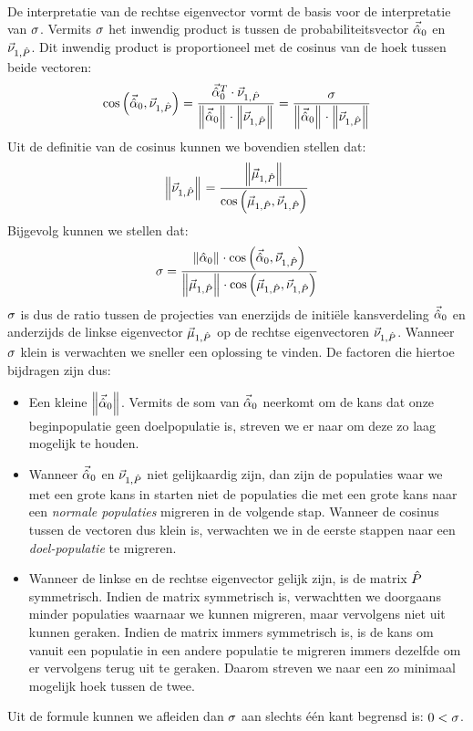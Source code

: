 \paragraph{}
De interpretatie van de rechtse eigenvector vormt de basis voor de interpretatie van $\metapa$. Vermits $\metapa$ het inwendig product is tussen de probabiliteitsvector $\probdistnormmeta{0}$ en $\evr[1,\removmat]$. Dit inwendig product is proportioneel met de cosinus van de hoek tussen beide vectoren:
\begin{equation}
\fun{\cos}{\probdistnormmeta{0},\evr[1,\removmat]}=\displaystyle\frac{\probdistnormmeta{0}^T\cdot\evr[1,\removmat]}{\dabs{\probdistnormmeta{0}}\cdot\dabs{\evr[1,\removmat]}}=\displaystyle\frac{\metapa}{\dabs{\probdistnormmeta{0}}\cdot\dabs{\evr[1,\removmat]}}
\end{equation}
Uit de definitie van de cosinus kunnen we bovendien stellen dat:
\begin{equation}
\dabs{\evr[1,\removmat]}=\displaystyle\frac{\dabs{\evl[1,\removmat]}}{\fun{\cos}{\evl[1,\removmat],\evr[1,\removmat]}}
\end{equation}
Bijgevolg kunnen we stellen dat:
\begin{equation}
\metapa=\displaystyle\frac{\dabs{\hat{\alpha}_0}\cdot\fun{\cos}{\probdistnormmeta{0},\evr[1,\removmat]}}{\dabs{\evl[1,\removmat]}\cdot\fun{\cos}{\evl[1,\removmat],\evr[1,\removmat]}}
\eqnlab{sigmaMeaning}
\end{equation}
$\metapa$ is dus de ratio tussen de projecties van enerzijds de initi\"ele kansverdeling $\probdistnormmeta{0}$ en anderzijds de linkse eigenvector $\evl[1,\removmat]$ op de rechtse eigenvectoren $\evr[1,\removmat]$. Wanneer $\metapa$ klein is verwachten we sneller een oplossing te vinden. De factoren die hiertoe bijdragen zijn dus:
\begin{itemize}
 \item Een kleine $\dabs{\probdistnormmeta{0}}$. Vermits de som van $\probdistnormmeta{0}$ neerkomt om de kans dat onze beginpopulatie geen doelpopulatie is, streven we er naar om deze zo laag mogelijk te houden.
 \item Wanneer $\probdistnormmeta{0}$ en $\evr[1,\removmat]$ niet gelijkaardig zijn, dan zijn de populaties waar we met een grote kans in starten niet de populaties die met een grote kans naar een \emph{normale populaties} migreren in de volgende stap. Wanneer de cosinus tussen de vectoren dus klein is, verwachten we in de eerste stappen naar een \emph{doel-populatie} te migreren.
 \item Wanneer de linkse en de rechtse eigenvector gelijk zijn, is de matrix $\removmat$ symmetrisch. Indien de matrix symmetrisch is, verwachtten we doorgaans minder populaties waarnaar we kunnen migreren, maar vervolgens niet uit kunnen geraken. Indien de matrix immers symmetrisch is, is de kans om vanuit een populatie in een andere populatie te migreren immers dezelfde om er vervolgens terug uit te geraken. Daarom streven we naar een zo minimaal mogelijk hoek tussen de twee.
\end{itemize}
Uit de formule kunnen we afleiden dan $\metapa$ aan slechts \'e\'en kant begrensd is: $0<\metapa$.

